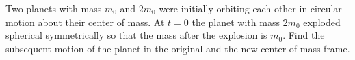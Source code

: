 \documentclass[a4paper,12pt]{report}
\begin{document}
{Two planets with mass \(m_0 \) and \(2m_0 \) were initially orbiting each other in circular motion about their center of mass. At \(t=0\) the planet with mass \(2m_0 \) exploded spherical symmetrically so that the mass after the explosion is \(m_0 \). Find the subsequent motion of the planet in the original and the new center of mass frame.  }
{} 
\end{document}
